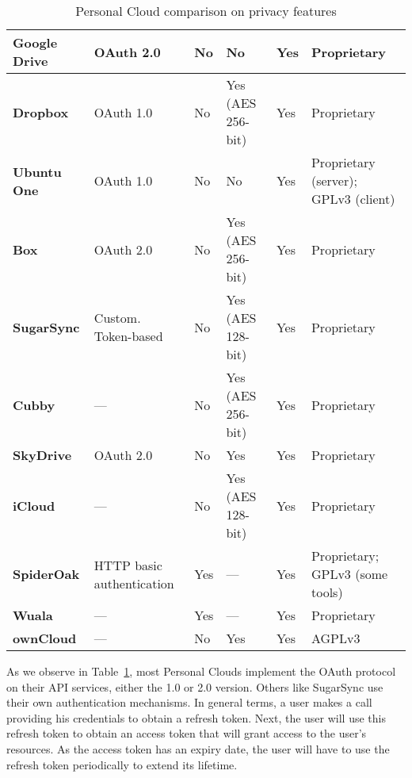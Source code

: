 {{\begin{table}
\begin{center}
\begin{tabular}{ | p{3.3cm} | p{2.5cm} | p{1.2cm} | p{1.9cm} | p{1.2cm} | p{3.8cm} | }
	\textbf{Google Drive} &
	OAuth 2.0 &
	No &
	No &
	Yes &
	Proprietary \\ \hline

	\textbf{Dropbox} &
	OAuth 1.0 &
	No &
	Yes (AES 256-bit) &
	Yes &
	Proprietary \\ \hline
	
	\textbf{Ubuntu One} &
	OAuth 1.0 &
	No &
	No &
	Yes &
	Proprietary (server); GPLv3 (client) \\ \hline
	
	\textbf{Box} &
	OAuth 2.0 &
	No &
	Yes (AES 256-bit) &
	Yes &
	Proprietary \\ \hline
	
	\textbf{SugarSync} & 
	Custom. Token-based &
	No &
	Yes (AES 128-bit) &
	Yes &
	Proprietary \\ \hline
	
	\textbf{Cubby} &
	--- &
	No &
	Yes (AES 256-bit) &
	Yes &
	Proprietary \\ \hline
	
	\textbf{SkyDrive} & 
	OAuth 2.0 &
	No &
	Yes &
	Yes &
	Proprietary \\ \hline

	\textbf{iCloud} &
	--- &
	No &
	Yes (AES 128-bit) &
	Yes &
	Proprietary \\ \hline
	
	\textbf{SpiderOak} & 
	HTTP basic authentication &
	Yes &
	--- &
	Yes &
	Proprietary; GPLv3 (some tools) \\ \hline

	\textbf{Wuala} &
	--- &
	Yes &
	--- &
	Yes &
	Proprietary \\ \hline
	
	\textbf{ownCloud} &
	--- &
	No &
	Yes &
	Yes &
	AGPLv3 \\ \hline

    \end{tabular}
    \caption{Personal Cloud comparison on privacy features}
    \label{tab:pc_privacy}
\end{center}
\end{table}
}

As we observe in Table~\ref{tab:pc_privacy}, most Personal Clouds implement the OAuth protocol on their API services, either the 1.0 or 2.0 version. Others like SugarSync use their own authentication mechanisms. In general terms, a user makes a call providing his credentials to obtain a refresh token. Next, the user will use this refresh token to obtain an access token that will grant access to the user's resources. As the access token has an expiry date, the user will have to use the refresh token periodically to extend its lifetime.

}
